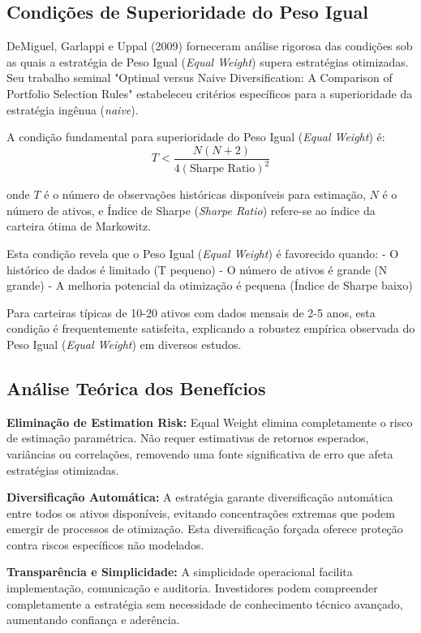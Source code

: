 \subsection{Condições de Superioridade do Peso Igual}

DeMiguel, Garlappi e Uppal (2009) forneceram análise rigorosa das condições sob as quais a estratégia de Peso Igual (\textit{Equal Weight}) supera estratégias otimizadas. Seu trabalho seminal "Optimal versus Naive Diversification: A Comparison of Portfolio Selection Rules" estabeleceu critérios específicos para a superioridade da estratégia ingênua (\textit{naive}).

A condição fundamental para superioridade do Peso Igual (\textit{Equal Weight}) é:
\begin{equation}
T < \frac{N(N+2)}{4(\text{Sharpe Ratio})^2}
\end{equation}

onde $T$ é o número de observações históricas disponíveis para estimação, $N$ é o número de ativos, e Índice de Sharpe (\textit{Sharpe Ratio}) refere-se ao índice da carteira ótima de Markowitz.

Esta condição revela que o Peso Igual (\textit{Equal Weight}) é favorecido quando:
- O histórico de dados é limitado (T pequeno)
- O número de ativos é grande (N grande)
- A melhoria potencial da otimização é pequena (Índice de Sharpe baixo)

Para carteiras típicas de 10-20 ativos com dados mensais de 2-5 anos, esta condição é frequentemente satisfeita, explicando a robustez empírica observada do Peso Igual (\textit{Equal Weight}) em diversos estudos.

\subsection{Análise Teórica dos Benefícios}

\textbf{Eliminação de Estimation Risk:} Equal Weight elimina completamente o risco de estimação paramétrica. Não requer estimativas de retornos esperados, variâncias ou correlações, removendo uma fonte significativa de erro que afeta estratégias otimizadas.

\textbf{Diversificação Automática:} A estratégia garante diversificação automática entre todos os ativos disponíveis, evitando concentrações extremas que podem emergir de processos de otimização. Esta diversificação forçada oferece proteção contra riscos específicos não modelados.

\textbf{Transparência e Simplicidade:} A simplicidade operacional facilita implementação, comunicação e auditoria. Investidores podem compreender completamente a estratégia sem necessidade de conhecimento técnico avançado, aumentando confiança e aderência.

